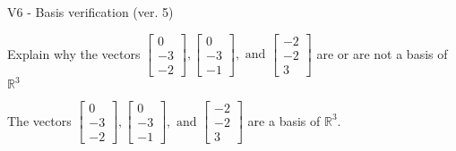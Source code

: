 \begin{exercise}
  \begin{exerciseTitle}V6 - Basis verification (ver. 5)\end{exerciseTitle}
  \begin{exerciseStatement}
    Explain why the vectors \(\left[\begin{array}{r}
0 \\
-3 \\
-2
\end{array}\right] , \left[\begin{array}{r}
0 \\
-3 \\
-1
\end{array}\right] , \text{ and } \left[\begin{array}{r}
-2 \\
-2 \\
3
\end{array}\right]\) are or are not a basis of \(\mathbb{R}^3\)	


  \end{exerciseStatement}
  \begin{exerciseAnswer}
   The vectors \(\left[\begin{array}{r}
0 \\
-3 \\
-2
\end{array}\right] , \left[\begin{array}{r}
0 \\
-3 \\
-1
\end{array}\right] , \text{ and } \left[\begin{array}{r}
-2 \\
-2 \\
3
\end{array}\right]\) 
  	 are  a basis of \(\mathbb{R}^3\).
  


  \end{exerciseAnswer}
\end{exercise}